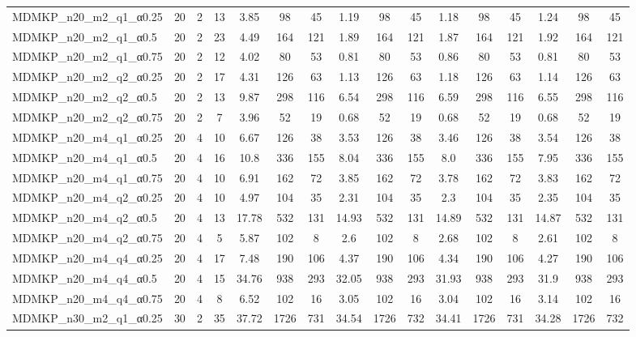\begin{sidewaystable}[!ht]
{\begin{tabular}{lccccccccccccccc}
MDMKP\_n20\_m2\_q1\_α0.25 & 20 & 2 & 13 & 3.85 & 98 & 45 & 1.19 & 98 & 45 & 1.18 & 98 & 45 & 1.24 & 98 & 45 \\
MDMKP\_n20\_m2\_q1\_α0.5 & 20 & 2 & 23 & 4.49 & 164 & 121 & 1.89 & 164 & 121 & 1.87 & 164 & 121 & 1.92 & 164 & 121 \\
MDMKP\_n20\_m2\_q1\_α0.75 & 20 & 2 & 12 & 4.02 & 80 & 53 &  \textcolor{blue2}{0.81} & 80 & 53 & 0.86 & 80 & 53 &  \textcolor{blue2}{0.81} & 80 & 53 \\
MDMKP\_n20\_m2\_q2\_α0.25 & 20 & 2 & 17 & 4.31 & 126 & 63 & 1.13 & 126 & 63 & 1.18 & 126 & 63 & 1.14 & 126 & 63 \\
MDMKP\_n20\_m2\_q2\_α0.5 & 20 & 2 & 13 & 9.87 & 298 & 116 &  \textcolor{blue2}{6.54} & 298 & 116 & 6.59 & 298 & 116 & 6.55 & 298 & 116 \\
MDMKP\_n20\_m2\_q2\_α0.75 & 20 & 2 & 7 & 3.96 & 52 & 19 &  \textcolor{blue2}{0.68} & 52 & 19 &  \textcolor{blue2}{0.68} & 52 & 19 &  \textcolor{blue2}{0.68} & 52 & 19 \\
MDMKP\_n20\_m4\_q1\_α0.25 & 20 & 4 & 10 & 6.67 & 126 & 38 & 3.53 & 126 & 38 & 3.46 & 126 & 38 & 3.54 & 126 & 38 \\
MDMKP\_n20\_m4\_q1\_α0.5 & 20 & 4 & 16 & 10.8 & 336 & 155 & 8.04 & 336 & 155 & 8.0 & 336 & 155 &  \textcolor{blue2}{7.95} & 336 & 155 \\
MDMKP\_n20\_m4\_q1\_α0.75 & 20 & 4 & 10 & 6.91 & 162 & 72 & 3.85 & 162 & 72 &  \textcolor{blue2}{3.78} & 162 & 72 & 3.83 & 162 & 72 \\
MDMKP\_n20\_m4\_q2\_α0.25 & 20 & 4 & 10 & 4.97 & 104 & 35 & 2.31 & 104 & 35 & 2.3 & 104 & 35 & 2.35 & 104 & 35 \\
MDMKP\_n20\_m4\_q2\_α0.5 & 20 & 4 & 13 & 17.78 & 532 & 131 & 14.93 & 532 & 131 & 14.89 & 532 & 131 & 14.87 & 532 & 131 \\
MDMKP\_n20\_m4\_q2\_α0.75 & 20 & 4 & 5 & 5.87 & 102 & 8 & 2.6 & 102 & 8 & 2.68 & 102 & 8 & 2.61 & 102 & 8 \\
MDMKP\_n20\_m4\_q4\_α0.25 & 20 & 4 & 17 & 7.48 & 190 & 106 & 4.37 & 190 & 106 & 4.34 & 190 & 106 &  \textcolor{blue2}{4.27} & 190 & 106 \\
MDMKP\_n20\_m4\_q4\_α0.5 & 20 & 4 & 15 & 34.76 & 938 & 293 & 32.05 & 938 & 293 & 31.93 & 938 & 293 & 31.9 & 938 & 293 \\
MDMKP\_n20\_m4\_q4\_α0.75 & 20 & 4 & 8 & 6.52 & 102 & 16 & 3.05 & 102 & 16 &  \textcolor{blue2}{3.04} & 102 & 16 & 3.14 & 102 & 16 \\
MDMKP\_n30\_m2\_q1\_α0.25 & 30 & 2 & 35 & 37.72 & 1726 & 731 & 34.54 & 1726 & 732 & 34.41 & 1726 & 731 & 34.28 & 1726 & 732 \\

\end{tabular}}
\end{sidewaystable}
